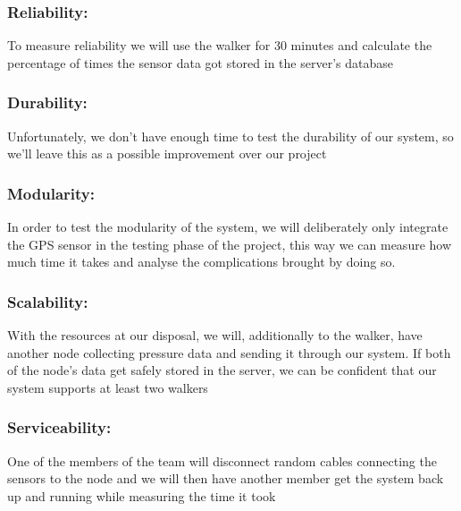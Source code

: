 \subsubsection{Reliability:}
To measure reliability we will use the walker for 30 minutes and calculate the percentage of times the sensor data got stored in the server’s database


\subsubsection{Durability:}
Unfortunately, we don’t have enough time to test the durability of our system, so we’ll leave this as a possible improvement over our project



\subsubsection{Modularity:}
In order to test the modularity of the system, we will deliberately only integrate the GPS sensor in the testing phase of the project, this way we can measure how much time it takes and analyse the complications brought by doing so.

\subsubsection{Scalability:}
With the resources at our disposal, we will, additionally to the walker, have another node collecting pressure data and sending it through our system. If both of the node’s data get safely stored in the server, we can be confident that our system supports at least two walkers

\subsubsection{Serviceability:}
One of the members of the team will disconnect random cables connecting the sensors to the node and we will then have another member get the system back up and running while measuring the time it took



